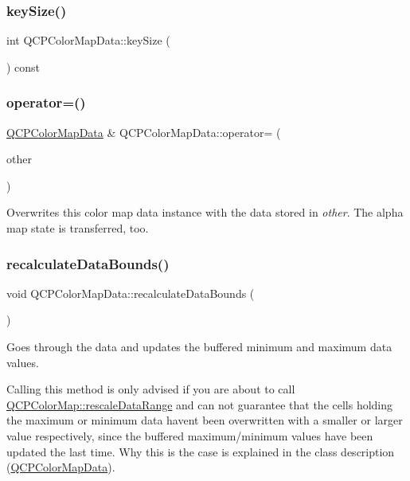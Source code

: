 \subsubsection{\texorpdfstring{keySize()}{keySize()}}
{\footnotesize\ttfamily int Q\+C\+P\+Color\+Map\+Data\+::key\+Size (\begin{DoxyParamCaption}{ }\end{DoxyParamCaption}) const\hspace{0.3cm}{\ttfamily [inline]}}

\mbox{\label{class_q_c_p_color_map_data_afdf4dd1b2f5714234fe84709b85c2a8d}} 
\subsubsection{\texorpdfstring{operator=()}{operator=()}}
{\footnotesize\ttfamily \mbox{\hyperlink{class_q_c_p_color_map_data}{Q\+C\+P\+Color\+Map\+Data}} \& Q\+C\+P\+Color\+Map\+Data\+::operator= (\begin{DoxyParamCaption}\item[{const \mbox{\hyperlink{class_q_c_p_color_map_data}{Q\+C\+P\+Color\+Map\+Data}} \&}]{other }\end{DoxyParamCaption})}

Overwrites this color map data instance with the data stored in {\itshape other}. The alpha map state is transferred, too. \mbox{\label{class_q_c_p_color_map_data_ab235ade8a4d64bd3adb26a99b3dd57ee}} 
\subsubsection{\texorpdfstring{recalculateDataBounds()}{recalculateDataBounds()}}
{\footnotesize\ttfamily void Q\+C\+P\+Color\+Map\+Data\+::recalculate\+Data\+Bounds (\begin{DoxyParamCaption}{ }\end{DoxyParamCaption})}

Goes through the data and updates the buffered minimum and maximum data values.

Calling this method is only advised if you are about to call \mbox{\hyperlink{class_q_c_p_color_map_a856608fa3dd1cc290bcd5f29a5575774}{Q\+C\+P\+Color\+Map\+::rescale\+Data\+Range}} and can not guarantee that the cells holding the maximum or minimum data haven\textquotesingle{}t been overwritten with a smaller or larger value respectively, since the buffered maximum/minimum values have been updated the last time. Why this is the case is explained in the class description (\mbox{\hyperlink{class_q_c_p_color_map_data}{Q\+C\+P\+Color\+Map\+Data}}).

